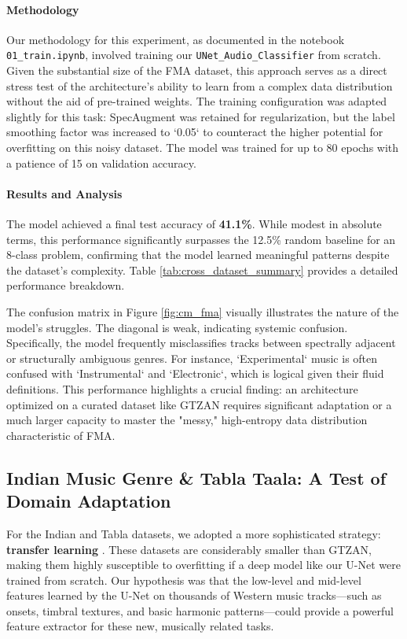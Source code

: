 \documentclass[11pt,a4paper]{article}
\begin{document}
\paragraph{Methodology}
Our methodology for this experiment, as documented in the notebook \texttt{01\_train.ipynb}, involved training our \texttt{UNet\_Audio\_Classifier} from scratch. Given the substantial size of the FMA dataset, this approach serves as a direct stress test of the architecture's ability to learn from a complex data distribution without the aid of pre-trained weights. The training configuration was adapted slightly for this task: SpecAugment was retained for regularization, but the label smoothing factor was increased to `0.05` to counteract the higher potential for overfitting on this noisy dataset. The model was trained for up to 80 epochs with a patience of 15 on validation accuracy.

\paragraph{Results and Analysis}
The model achieved a final test accuracy of \textbf{41.1\%}. While modest in absolute terms, this performance significantly surpasses the 12.5\% random baseline for an 8-class problem, confirming that the model learned meaningful patterns despite the dataset's complexity. Table \ref{tab:cross_dataset_summary} provides a detailed performance breakdown.

The confusion matrix in Figure \ref{fig:cm_fma} visually illustrates the nature of the model's struggles. The diagonal is weak, indicating systemic confusion. Specifically, the model frequently misclassifies tracks between spectrally adjacent or structurally ambiguous genres. For instance, `Experimental` music is often confused with `Instrumental` and `Electronic`, which is logical given their fluid definitions. This performance highlights a crucial finding: an architecture optimized on a curated dataset like GTZAN requires significant adaptation or a much larger capacity to master the "messy," high-entropy data distribution characteristic of FMA.

\subsection{Indian Music Genre \& Tabla Taala: A Test of Domain Adaptation}

For the Indian and Tabla datasets, we adopted a more sophisticated strategy: \textbf{transfer learning} \textbf{\cite{choi2017transfer}}. %
These datasets are considerably smaller than GTZAN, making them highly susceptible to overfitting if a deep model like our U-Net were trained from scratch. Our hypothesis was that the low-level and mid-level features learned by the U-Net on thousands of Western music tracks—such as onsets, timbral textures, and basic harmonic patterns—could provide a powerful feature extractor for these new, musically related tasks.
\end{document}
